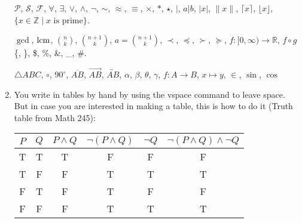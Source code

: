\documentclass{article} %
\begin{document}
\begin{enumerate}
$\mathcal{P}$, %
$\mathcal{S}$,
$\mathcal{F}$,
$\forall$,
$\exists$,
$\lor$, %
$\land$, %
$\neg$, %
$\sim$, %
$\approx$,
$\equiv$,
$\times$, %
$\ast$,
$\star$,
$\mid$, %
$a | b$, %
$|x|$, %
$\|x\|$,
$\lceil x \rceil$,
$\lfloor x \rfloor$,
$\{x \in \mathbb{Z} \mid x \mbox{ is prime} \}$. %
\vspace{.5\baselineskip}

$\gcd$, %
${\rm lcm}$, %
$n \choose k$,
$n+1 \choose k$, %
$a = {n+1 \choose k}$, %
$\prec$, %
$\preceq$,
$\succ$, %
$\succeq$,
$f \colon [0,\infty) \rightarrow \mathbb{R}$, 
$f \circ g$ %
\{, %
\}, %
\$, %
\%,
\&,
\_,
\#.

\vspace{.5\baselineskip}
$\bigtriangleup ABC$, $\circ$, %
$90^{\circ}$, %
$\overline{AB}$,
$\overrightarrow{AB}$,
$\overleftrightarrow{AB}$, $\alpha$, $\beta$, $\theta$, $\gamma$, $f: A \longrightarrow B$, $x \mapsto y$, $\in$, $\sin$, $\cos$ %


\item You write in tables by hand by using the vspace command to leave space.  But in case you are interested in making a table, this is how to do it (Truth table from Math 245):

\begin{center}
\begin{tabular}{|c|c||c|c|c|c|}
\hline
$P$ & $Q$ & $P \land Q$ & $\neg(P \land Q)$ & $\neg Q$ & $\neg(P \land Q) \land \neg Q$ \\
\hline
T & T & T & F & F & F \\
T & F & F & T & T & T \\
F & T & F & T & F & F \\
F & F & F & T & T & T \\
\hline
\end{tabular}
\end{center}


\end{enumerate}
\end{document}
